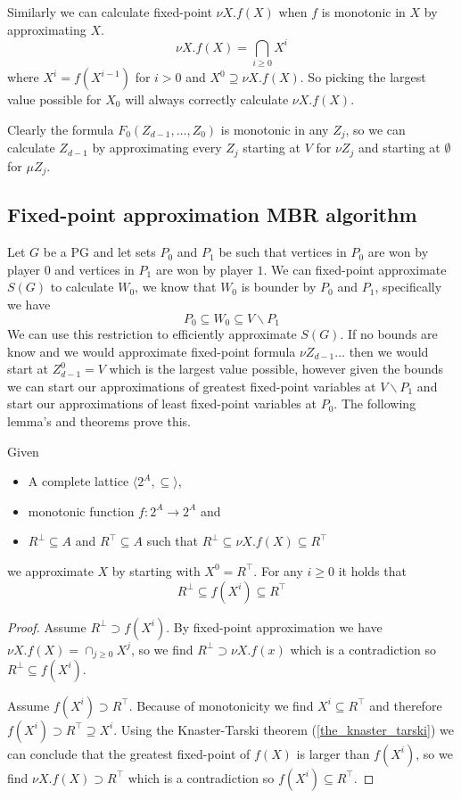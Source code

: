 Similarly we can calculate fixed-point $\nu X.f(X)$ when $f$ is monotonic in $X$ by approximating $X$.
\[ \nu X.f(X) = \bigcap_{i \geq 0} X^i \]
where $X^i = f(X^{i-1})$ for $i > 0$ and $X^0 \supseteq \nu X.f(X)$. So picking the largest value possible for $X_0$ will always correctly calculate $\nu X. f(X)$.

Clearly the formula $F_0(Z_{d-1},\dots,Z_0)$ is monotonic in any $Z_j$, so we can calculate $Z_{d-1}$ by approximating every $Z_j$ starting at $V$ for $\nu Z_j$ and starting at $\emptyset$ for $\mu Z_j$.


\subsection{Fixed-point approximation MBR algorithm}
Let $G$ be a PG and let sets $P_0$ and $P_1$ be such that vertices in $P_0$ are won by player $0$ and vertices in $P_1$ are won by player $1$. We can fixed-point approximate $S(G)$ to calculate $W_0$, we know that $W_0$ is bounder by $P_0$ and $P_1$, specifically we have
\[ P_0 \subseteq W_0 \subseteq V\backslash P_1\]
We can use this restriction to efficiently approximate $S(G)$. If no bounds are know and we would approximate fixed-point formula $\nu Z_{d-1}\dots$ then we would start at $Z_{d-1}^0 = V$ which is the largest value possible, however given the bounds we can start our approximations of greatest fixed-point variables at $V\backslash P_1$ and start our approximations of least fixed-point variables at $P_0$. The following lemma's and theorems prove this.
\begin{lemma}
	\label{lem_fixpoint_bounds_nu}
	Given
	\begin{itemize}
		\item A complete lattice $\langle 2^A, \subseteq \rangle$,
		\item monotonic function $f : 2^A \rightarrow 2^A$ and
		\item $R^\bot \subseteq A$ and $R^\top \subseteq A$ such that $R^\bot \subseteq \nu X. f(X) \subseteq R^\top$
	\end{itemize}
	we approximate $X$ by starting with $X^0 = R^\top$. For any $i \geq 0$ it holds that
	\[ R^\bot \subseteq f(X^i) \subseteq R^\top \]
	\begin{proof}
		Assume $R^\bot \supset f(X^i)$. By fixed-point approximation we have $\nu X.f(X) = \cap_{j\geq0} X^j$, so we find $R^\bot \supset \nu X.f(x)$ which is a contradiction so $R^\bot \subseteq f(X^i)$.
		
		Assume $f(X^i) \supset R^\top$. Because of monotonicity we find $X^i \subseteq R^\top$ and therefore $f(X^i) \supset R^\top \supseteq X^i$. Using the Knaster-Tarski theorem (\ref{the_knaster_tarski}) we can conclude that the greatest fixed-point of $f(X)$ is larger than $f(X^i)$, so we find $\nu X.f(X) \supset R^\top$ which is a contradiction so $f(X^i) \subseteq R^\top$.
	\end{proof}
\end{lemma}

